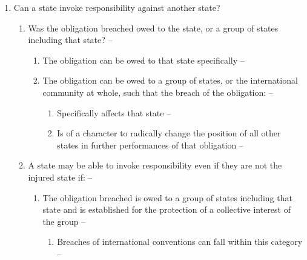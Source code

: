 \begin{enumerate}
\begin{enumerate}
\begin{enumerate}
        \end{enumerate}
    \end{enumerate}
    \item Can a state invoke responsibility against another state?
    \begin{enumerate}
        \item Was the obligation breached owed to the state, or a group of states including that state? -- 
        \begin{enumerate}
            \item The obligation can be owed to that state specifically -- 
            \item The obligation can be owed to a group of states, or the international community at whole, such that the breach of the obligation: -- 
            \begin{enumerate}
                \item Specifically affects that state -- 
                \item Is of a character to radically change the position of all other states in further performances of that obligation -- 
            \end{enumerate}
        \end{enumerate}
        \item A state may be able to invoke responsibility even if they are not the injured state if: -- 
        \begin{enumerate}
            \item The obligation breached is owed to a group of states including that state and is established for the protection of a collective interest of the group -- 
            \begin{enumerate}
                \item Breaches of international conventions can fall within this category -- 

\end{enumerate}
\end{enumerate}
\end{enumerate}
\end{enumerate}
